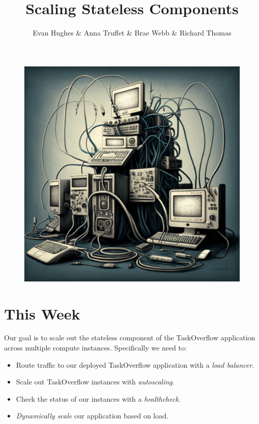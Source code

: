 \documentclass{csse4400}
\title{Scaling Stateless Components}
\author{Evan Hughes \& Anna Truffet \& Brae Webb \& Richard Thomas}
\date{\week[practical]{6}}
\begin{document}
\maketitle

\begin{figure}[h]
    \begin{center}
        \includegraphics[scale=0.4]{images/scaling-out}
    \end{center}
\end{figure}



\section{This Week}
Our goal is to scale out the stateless component of the TaskOverflow application across multiple compute instances.
Specifically we need to:
\begin{itemize}[topsep=4pt,partopsep=1pt,itemsep=2pt,parsep=2pt]
    \item Route traffic to our deployed TaskOverflow application with a \textsl{load balancer}.
    \item Scale out TaskOverflow instances with \textsl{autoscaling}.
    \item Check the status of our instances with a \textsl{healthcheck}.
    \item \textsl{Dynamically scale} our application based on load.
\end{itemize}
\end{document}
